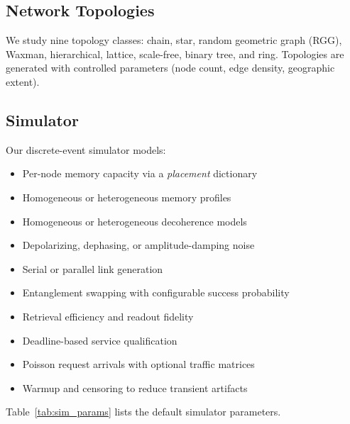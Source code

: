 \documentclass[quantumrep,article,submit,moreauthors]{Definitions/mdpi}
\begin{document}
\subsection{Network Topologies}

We study nine topology classes: chain, star, random geometric graph (RGG), Waxman, hierarchical, lattice, scale-free, binary tree, and ring. Topologies are generated with controlled parameters (node count, edge density, geographic extent).

\subsection{Simulator}

Our discrete-event simulator models:
\begin{itemize}[leftmargin=2em]
\item Per-node memory capacity via a \textit{placement} dictionary
\item Homogeneous or heterogeneous memory profiles
\item Homogeneous or heterogeneous decoherence models
\item Depolarizing, dephasing, or amplitude-damping noise
\item Serial or parallel link generation
\item Entanglement swapping with configurable success probability
\item Retrieval efficiency and readout fidelity
\item Deadline-based service qualification
\item Poisson request arrivals with optional traffic matrices
\item Warmup and censoring to reduce transient artifacts
\end{itemize}

Table~\ref{tab:sim_params} lists the default simulator parameters.

\begin{table}[htbp]
\centering
\caption{Simulator parameters used throughout the paper unless otherwise stated.}
\label{tab:sim_params}
\end{table}
\end{document}
